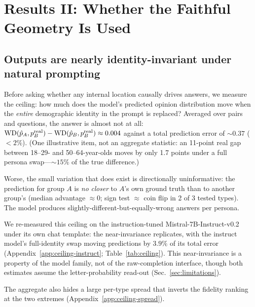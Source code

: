 \section{Results II: Whether the Faithful Geometry Is Used}
\label{sec:gap}

\subsection{Outputs are nearly identity-invariant under natural prompting}
\label{sec:ceiling}
Before asking whether any internal location causally drives answers, we
measure the ceiling: how much does the model's predicted opinion
distribution move when the \emph{entire} demographic identity in the
prompt is replaced? Averaged over pairs and questions, the answer is
almost not at all: $\mathrm{WD}(\hat{p}_A, p^{\mathrm{real}}_B) -
\mathrm{WD}(\hat{p}_B, p^{\mathrm{real}}_B) \approx 0.004$ against a total
prediction error of ${\sim}0.37$ (${<}2\%$). (One illustrative item, not
an aggregate statistic: an 11-point real gap between 18--29- and
50--64-year-olds moves by only 1.7 points under a full persona
swap---${\sim}15\%$ of the true difference.)

Worse, the small variation that does exist is directionally
uninformative: the prediction for group $A$ is \emph{no closer} to $A$'s
own ground truth than to another group's (median advantage
$\approx0$; sign test ${\approx}$ coin flip in 2 of 3 tested types).
The model produces slightly-different-but-equally-wrong answers per
persona. %

We re-measured this ceiling on the instruction-tuned
Mistral-7B-Instruct-v0.2 under its own chat template: the near-invariance
replicates, with the instruct model's full-identity swap moving
predictions by $3.9\%$ of its total error (Appendix~\ref{app:ceiling-instruct};
Table~\ref{tab:ceiling}). This near-invariance is a property of the
model family, not of the raw-completion interface, though both estimates
assume the letter-probability read-out (Sec.~\ref{sec:limitations}).

The aggregate also hides a large per-type spread that inverts the
fidelity ranking at the two extremes (Appendix~\ref{app:ceiling-spread}).


